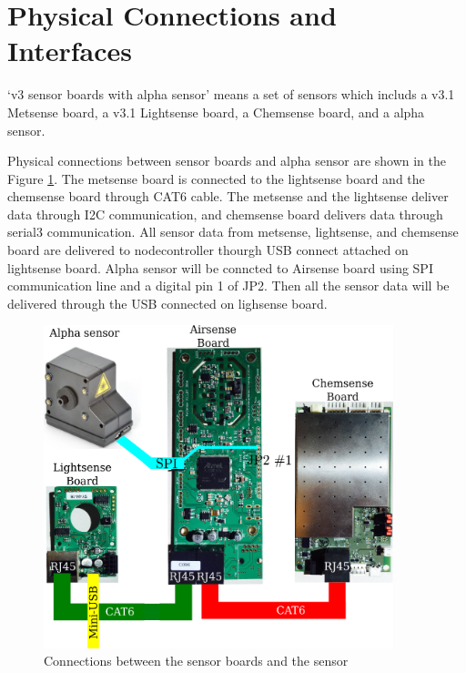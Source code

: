 \section{Physical Connections and Interfaces}

`v3 sensor boards with alpha sensor' means a set of sensors which includs a v3.1 Metsense board, a v3.1 Lightsense board, a Chemsense board, and a alpha sensor.
\par
Physical connections between sensor boards and alpha sensor are shown in the Figure \ref{fig:physicalConnections}. The metsense board is connected to the lightsense board and the chemsense board through CAT6 cable. The metsense and the lightsense deliver data through I2C communication, and chemsense board delivers data through serial3 communication. All sensor data from metsense, lightsense, and chemsense board are delivered to nodecontroller thourgh USB connect attached on lightsense board. Alpha sensor will be conncted to Airsense board using SPI communication line and a digital pin 1 of JP2. Then all the sensor data will be delivered through the USB connected on lighsense board.

\begin{figure}[h]
\begin{center}
\includegraphics[width=4in]{novc.png}
\caption{Connections between the sensor boards and the sensor}
\label{fig:physicalConnections}
\end{center}
\end{figure}
